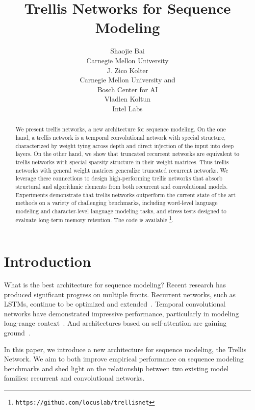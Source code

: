 \documentclass{article} \usepackage{iclr2019_conference,times}
\title{Trellis Networks for Sequence Modeling}
\author{Shaojie Bai \\
Carnegie Mellon University\\
\And
J. Zico Kolter \\
Carnegie Mellon University and \\
Bosch Center for AI\\
\And
Vladlen Koltun \\
Intel Labs \\
}
\begin{document}
\maketitle

\begin{abstract}
We present trellis networks, a new architecture for sequence modeling. On the one hand, a trellis network is a temporal convolutional network with special structure, characterized by weight tying across depth and direct injection of the input into deep layers. On the other hand, we show that truncated recurrent networks are equivalent to trellis networks with special sparsity structure in their weight matrices. Thus trellis networks with general weight matrices generalize truncated recurrent networks. We leverage these connections to design high-performing trellis networks that absorb structural and algorithmic elements from both recurrent and convolutional models. Experiments demonstrate that trellis networks outperform the current state of the art methods on a variety of challenging benchmarks, including word-level language modeling and character-level language modeling tasks, and stress tests designed to evaluate long-term memory retention. The code is available \href{https://github.com/locuslab/trellisnet}{\color{violet}{here}}\footnote{\texttt{https://github.com/locuslab/trellisnet}}.
\end{abstract}


\section{Introduction}
\label{sec:introduction}

What is the best architecture for sequence modeling? Recent research has produced significant progress on multiple fronts. Recurrent networks, such as LSTMs, continue to be optimized and extended~\citep{merityRegOpt,Melis2018,yang2018breaking,trinh2018learning}. Temporal convolutional networks have demonstrated impressive performance, particularly in modeling long-range context~\citep{waveNet,dauphinGatedConv,bai2018empirical}. And architectures based on self-attention are gaining ground~\citep{vaswani2017attention,santoro2018relational}.

In this paper, we introduce a new architecture for sequence modeling, the Trellis Network. We aim to both improve empirical performance on sequence modeling benchmarks and shed light on the relationship between two existing model families: recurrent and convolutional networks.
\end{document}
